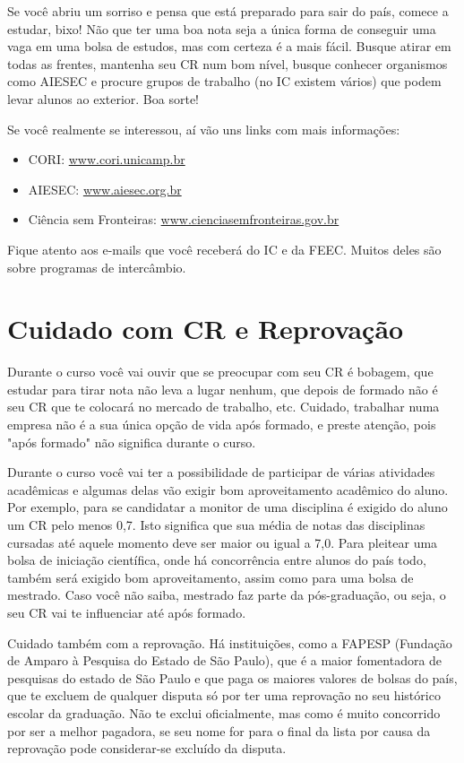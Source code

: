 Se você abriu um sorriso e pensa que está preparado para sair do país,
comece a estudar, bixo! Não que ter uma boa nota seja a única forma de
conseguir uma vaga em uma bolsa de estudos, mas com certeza é a mais fácil.
Busque atirar em todas as frentes, mantenha seu CR num bom nível, busque
conhecer organismos como AIESEC e procure grupos de trabalho (no IC existem
vários) que podem levar alunos ao exterior. Boa sorte!

Se você realmente se interessou, aí vão uns links com mais informações:

\begin{itemize}
\item  CORI: \url{www.cori.unicamp.br}
\item  AIESEC: \url{www.aiesec.org.br}
\item  Ciência sem Fronteiras: \url{www.cienciasemfronteiras.gov.br}
\end{itemize}

Fique atento aos e-mails que você receberá do IC e da FEEC. Muitos deles são sobre programas de intercâmbio.

\section{Cuidado com CR e Reprovação}

Durante o curso você vai ouvir que se preocupar com seu CR é bobagem, que
estudar para tirar nota não leva a lugar nenhum, que depois de formado não é seu
CR que te colocará no mercado de trabalho, etc. Cuidado, trabalhar numa empresa não
é a sua única opção de vida após formado, e preste atenção, pois "após formado"
não significa durante o curso.

Durante o curso você vai ter a possibilidade de participar de várias atividades
acadêmicas e algumas delas vão exigir bom aproveitamento acadêmico do aluno. Por
exemplo, para se candidatar a monitor de uma disciplina é exigido do aluno um CR
pelo menos 0,7. Isto significa que sua média de notas das disciplinas cursadas até
aquele momento deve ser maior ou igual a 7,0. Para pleitear uma bolsa de
iniciação científica, onde há concorrência entre alunos do país todo, também
será exigido bom aproveitamento, assim como para uma bolsa de mestrado. Caso
você não saiba, mestrado faz parte da pós-graduação, ou seja, o seu CR vai te
influenciar até após formado.

Cuidado também com a reprovação. Há instituições, como a FAPESP (Fundação de
Amparo à Pesquisa do Estado de São Paulo), que é a maior fomentadora de pesquisas
do estado de São Paulo e que paga os maiores valores de bolsas do país, que te
excluem de qualquer disputa só por ter uma reprovação no seu histórico escolar da
graduação. Não te exclui oficialmente, mas como é muito concorrido por ser
a melhor pagadora, se seu nome for para o final da lista por causa da reprovação
pode considerar-se excluído da disputa.

